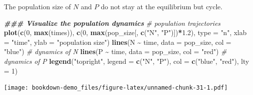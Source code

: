\documentclass[
]{book}
\newenvironment{Shaded}{\begin{snugshade}}{\end{snugshade}}
\newcommand{\AttributeTok}[1]{\textcolor[rgb]{0.13,0.29,0.53}{#1}}
\newcommand{\CommentTok}[1]{\textcolor[rgb]{0.56,0.35,0.01}{\textit{#1}}}
\newcommand{\DecValTok}[1]{\textcolor[rgb]{0.00,0.00,0.81}{#1}}
\newcommand{\DocumentationTok}[1]{\textcolor[rgb]{0.56,0.35,0.01}{\textbf{\textit{#1}}}}
\newcommand{\FloatTok}[1]{\textcolor[rgb]{0.00,0.00,0.81}{#1}}
\newcommand{\FunctionTok}[1]{\textcolor[rgb]{0.13,0.29,0.53}{\textbf{#1}}}
\newcommand{\NormalTok}[1]{#1}
\newcommand{\SpecialCharTok}[1]{\textcolor[rgb]{0.81,0.36,0.00}{\textbf{#1}}}
\newcommand{\StringTok}[1]{\textcolor[rgb]{0.31,0.60,0.02}{#1}}
\begin{document}
The population size of \(N\) and \(P\) do not stay at the equilibrium but cycle.

\begin{Shaded}
\begin{Highlighting}[]
\DocumentationTok{\#\#\# Visualize the population dynamics}
\CommentTok{\# population trajectories}
\FunctionTok{plot}\NormalTok{(}\FunctionTok{c}\NormalTok{(}\DecValTok{0}\NormalTok{, }\FunctionTok{max}\NormalTok{(times)), }\FunctionTok{c}\NormalTok{(}\DecValTok{0}\NormalTok{, }\FunctionTok{max}\NormalTok{(pop\_size[, }\FunctionTok{c}\NormalTok{(}\StringTok{"N"}\NormalTok{, }\StringTok{"P"}\NormalTok{)])}\SpecialCharTok{*}\FloatTok{1.2}\NormalTok{), }\AttributeTok{type =} \StringTok{"n"}\NormalTok{, }\AttributeTok{xlab =} \StringTok{"time"}\NormalTok{, }\AttributeTok{ylab =} \StringTok{"population size"}\NormalTok{)}
\FunctionTok{lines}\NormalTok{(N }\SpecialCharTok{\textasciitilde{}}\NormalTok{ time, }\AttributeTok{data =}\NormalTok{ pop\_size, }\AttributeTok{col =} \StringTok{"blue"}\NormalTok{) }\CommentTok{\# dynamics of N}
\FunctionTok{lines}\NormalTok{(P }\SpecialCharTok{\textasciitilde{}}\NormalTok{ time, }\AttributeTok{data =}\NormalTok{ pop\_size, }\AttributeTok{col =} \StringTok{"red"}\NormalTok{) }\CommentTok{\# dynamics of P}
\FunctionTok{legend}\NormalTok{(}\StringTok{"topright"}\NormalTok{, }\AttributeTok{legend =} \FunctionTok{c}\NormalTok{(}\StringTok{"N"}\NormalTok{, }\StringTok{"P"}\NormalTok{), }\AttributeTok{col =} \FunctionTok{c}\NormalTok{(}\StringTok{"blue"}\NormalTok{, }\StringTok{"red"}\NormalTok{), }\AttributeTok{lty =} \DecValTok{1}\NormalTok{)}
\end{Highlighting}
\end{Shaded}

\texttt{[image: bookdown-demo\_files/figure-latex/unnamed-chunk-31-1.pdf]}
\end{document}

